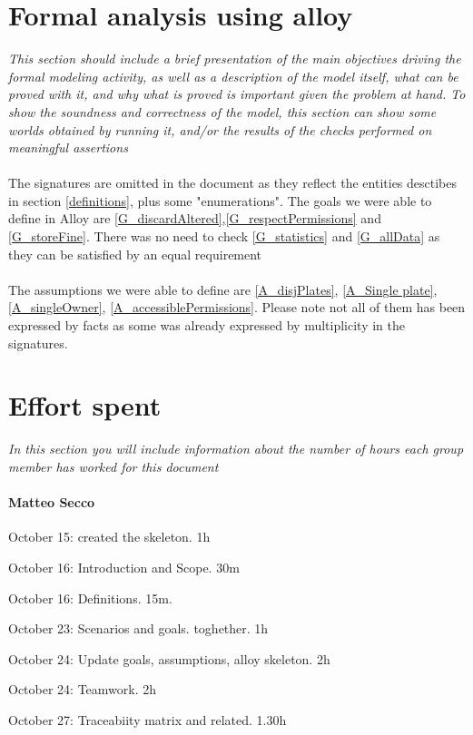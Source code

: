\documentclass{article}
\begin{document}
\section{Formal analysis using alloy} \textit{This section should include a brief presentation of the main objectives driving the formal modeling activity, as well as a description of the model itself, what can be proved with it, and why what is proved is important given the problem at hand. To show the soundness and correctness of the model, this section can show some worlds obtained by running it, and/or the results of the checks performed on meaningful assertions}
	\paragraph{}The signatures are omitted in the document as they reflect the entities 				desctibes in section \ref{definitions}, plus some "enumerations". The goals we were able to define in Alloy are \ref{G_discardAltered},\ref{G_respectPermissions} and \ref{G_storeFine}.
	There was no need to check \ref{G_statistics} and \ref{G_allData} as they can be satisfied 	by an equal requirement
	\paragraph{}The assumptions we were able to define are \ref{A_disjPlates}, \ref{A_Single plate}, \ref{A_singleOwner}, \ref{A_accessiblePermissions}. Please note not all of them has been expressed by facts as some was already expressed by multiplicity in the signatures.
	
\section{Effort spent} \textit{In this section you will include information about the number of hours each group member has worked for this document}

	\paragraph{Matteo Secco} 
		\begin{list}{-}{}
			\item October 15: created the skeleton. 1h
			\item October 16: Introduction and Scope. 30m
			\item October 16: Definitions. 15m.
			\item October 23: Scenarios and goals. toghether. 1h
			\item October 24: Update goals, assumptions, alloy skeleton. 2h
			\item October 24: Teamwork. 2h
			\item October 27: Traceabiity matrix and related. 1.30h
		\end{list}
		
\end{document}
